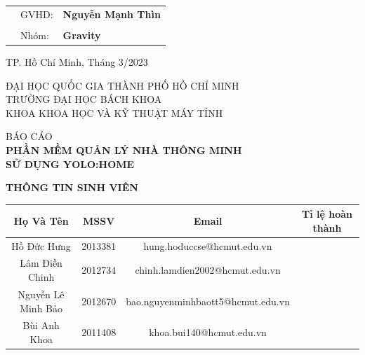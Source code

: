 \documentclass[a4paper, 13pt]{article}
\theoremstyle{definition}
\begin{document}
\begin{titlepage}
\vspace{0.5cm}
\begin{table}[h]
\begin{tabular}{lll}
\hspace{4.3 cm}  & {GVHD}: & \textbf{\large Nguyễn Mạnh Thìn}\\
\vspace{0.5cm}
                &          & \\
& {Nhóm:} & \textbf{Gravity} \\

\end{tabular}
\end{table}
\vspace{4 cm}
\begin{center}
{\footnotesize TP. Hồ Chí Minh, Tháng 3/2023}
\end{center}
\end{titlepage}
\newpage
\thispagestyle{empty}
\begin{center}
    \large{ĐẠI HỌC QUỐC GIA THÀNH PHỐ HỒ CHÍ MINH}\\
    \large{TRƯỜNG ĐẠI HỌC BÁCH KHOA}\\
    \large{KHOA KHOA HỌC VÀ KỸ THUẬT MÁY TÍNH}\\
    
    \vspace{2cm}
    
    \large{BÁO CÁO }\\
    \vspace{1cm}
    \textbf{\Large PHẦN MỀM QUẢN LÝ NHÀ THÔNG MINH}\\
    \textbf{\Large SỬ DỤNG YOLO:HOME}\\
    \vspace{0.3cm}
    
\end{center}

\vspace{4cm}


\begin{center}
    \textbf{THÔNG TIN SINH VIÊN}
\end{center}
\begin{center}
    \begin{tabular}{|c|c|c|c|}
    \hline
    \rowcolor[rgb]{0.8,0.8,0.8}
    Họ Và Tên & MSSV & Email & Tỉ lệ hoàn thành\\
    \hline
    Hồ Đức Hưng & 2013381 & hung.hoduccse@hcmut.edu.vn & \\
    Lâm Điền Chinh & 2012734 & chinh.lamdien2002@hcmut.edu.vn & \\
    Nguyễn Lê Minh Bảo & 2012670 & bao.nguyenminhbaott5@hcmut.edu.vn & \\
    Bùi Anh Khoa & 2011408 & khoa.bui140@hcmut.edu.vn & \\
    \hline
\end{tabular}
\end{center}
\end{document}
